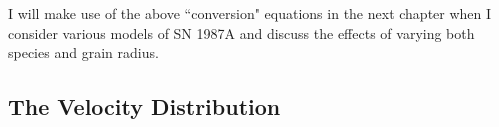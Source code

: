 
I will make use of the above ``conversion" equations in the next chapter when I consider various models of SN 1987A and discuss the effects of varying both species and grain radius.

%
%
%

\subsection{The Velocity Distribution}

